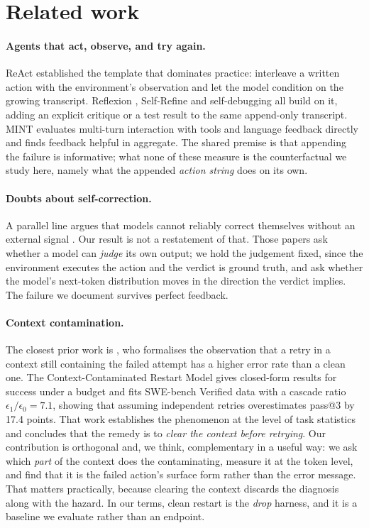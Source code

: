 \section{Related work}
\label{sec:related}

\paragraph{Agents that act, observe, and try again.}
ReAct \citep{yao2023react} established the template that dominates practice:
interleave a written action with the environment's observation and let the model
condition on the growing transcript. Reflexion \citep{shinn2023reflexion},
Self-Refine \citep{madaan2023selfrefine} and self-debugging
\citep{chen2024selfdebug} all build on it, adding an explicit critique or a test
result to the same append-only transcript. MINT \citep{wang2024mint} evaluates
multi-turn interaction with tools and language feedback directly and finds
feedback helpful in aggregate. The shared premise is that appending the failure
is informative; what none of these measure is the counterfactual we study here,
namely what the appended \emph{action string} does on its own.

\paragraph{Doubts about self-correction.}
A parallel line argues that models cannot reliably correct themselves without an
external signal \citep{huang2024selfcorrect,valmeekam2023critiquing}. Our result
is not a restatement of that. Those papers ask whether a model can \emph{judge}
its own output; we hold the judgement fixed, since the environment executes the
action and the verdict is ground truth, and ask whether the model's next-token
distribution moves in the direction the verdict implies. The failure we document
survives perfect feedback.

\paragraph{Context contamination.}
The closest prior work is \citet{yang2026contamination}, who formalises the
observation that a retry in a context still containing the failed attempt has a
higher error rate than a clean one. The Context-Contaminated Restart Model gives
closed-form results for success under a budget and fits SWE-bench Verified data
with a cascade ratio $\epsilon_1/\epsilon_0 = 7.1$, showing that assuming
independent retries overestimates pass@3 by 17.4 points. That work establishes
the phenomenon at the level of task statistics and concludes that the remedy is
to \emph{clear the context before retrying}. Our contribution is orthogonal and,
we think, complementary in a useful way: we ask which \emph{part} of the context
does the contaminating, measure it at the token level, and find that it is the
failed action's surface form rather than the error message. That matters
practically, because clearing the context discards the diagnosis along with the
hazard. In our terms, clean restart is the \emph{drop} harness, and it is a
baseline we evaluate rather than an endpoint.

